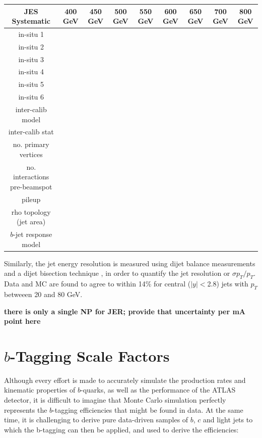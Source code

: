 \begin{table}
    \scriptsize
    \begin{tabular}{c c c c c c c c c } \hline \hline
    JES Systematic & 400 GeV & 450 GeV & 500 GeV & 550 GeV & 600 GeV & 650 GeV & 700 GeV & 800 GeV\\ \hline
    in-situ 1 & & & & & & & & \\
    in-situ 2 & & & & & & & & \\
    in-situ 3 & & & & & & & & \\
    in-situ 4 & & & & & & & & \\
    in-situ 5 & & & & & & & & \\
    in-situ 6 & & & & & & & & \\
    inter-calib model & & & & & & & &  \\
    inter-calib stat & & & & & & & & \\
    no. primary vertices & & & & & & & & \\
    no. interactions pre-beamspot & & & & & & & & \\
    pileup & & & & & & & & \\
    rho topology (jet area) & & & & & & & &  \\
    $b$-jet response model & & & & & & & & \\
    \end{tabular}
\end{table}



Similarly, the jet energy resolution is measured using dijet balance measurements and 
a dijet bisection technique \cite{jer}, in
order to quantify the jet resolution or $\sigma p_T/p_T$.  Data and MC are 
found to agree to within 14\% for central ($|y|<$2.8) jets with $p_T$ betweeen
20 and 80 GeV.

\textbf{there is only a single NP for JER; provide that uncertainty per mA point here}

%

\section{$b$-Tagging Scale Factors}
\label{sec:SF}
Although every effort is made to accurately simulate the production rates and
kinematic properties of $b$-quarks, as well as the performance of the ATLAS
detector, it is difficult to imagine that Monte Carlo simulation perfectly represents
the $b$-tagging efficiencies that might be found in data.  At the same time, it
is challenging to derive pure data-driven samples of $b$, $c$ and light jets to which
the b-tagging can then be applied, and used to derive the efficiencies:

